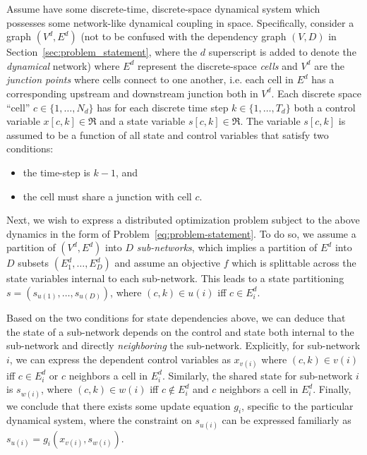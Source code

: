 Assume have some discrete-time, discrete-space dynamical system which possesses some network-like dynamical coupling in space. Specifically, consider a graph $\left(V^d, E^d\right)$ (not to be confused with the dependency graph $\left(V,D\right)$ in Section~\ref{sec:problem_statement}, where the $d$ superscript is added to denote the \emph{dynamical} network) where $E^d$ represent the discrete-space \emph{cells} and $V^d$ are the \emph{junction points} where cells connect to one another, i.e. each cell in $E^d$ has a corresponding upstream and downstream junction both in $V^d$.  Each discrete space ``cell'' $c \in \{1,\ldots,N_d\} $ has for each discrete time step $k \in \{1,\ldots,T_d\} $ both a control variable $x\left[c,k\right] \in \Re$ and a state variable $s\left[c,k\right] \in \Re$. The variable $s\left[c,k\right]$ is assumed to be a function of all state and control variables that satisfy two conditions:

\begin{itemize}
	\item the time-step is $k-1$, and
	\item the cell must share a junction with cell $c$.
\end{itemize}

Next, we wish to express a distributed optimization problem subject to the above dynamics in the form of Problem~\eqref{eq:problem-statement}. To do so, we assume a partition of $\left(V^d,E^d\right)$ into $D$ \emph{sub-networks}, which implies a partition of $E^d$ into $D$ subsets $\left(E^d_1,\ldots, E^d_D\right)$ and assume an objective $f$ which is splittable across the state variables internal to each sub-network. This leads to a state partitioning $s=\left(s_{u\left(1\right)}, \ldots, s_{u\left(D\right)}\right)$, where $ \left(c,k\right) \in u\left(i\right)$ iff $c \in E^d_i$.

Based on the two conditions for state dependencies above, we can deduce that the state of a sub-network depends on the control and state both internal to the sub-network and directly \emph{neighboring} the sub-network. Explicitly, for sub-network $i$, we can express the dependent control variables as $x_{v\left(i\right)}$ where $\left(c,k\right)\in v\left(i\right)$ iff $c \in E^d_i$ or $c$ neighbors a cell in $E^d_i$. Similarly, the shared state for sub-network $i$ is $s_{w\left(i\right)}$, where $\left(c,k\right)\in w\left(i\right)$ iff $c \notin E^d_i$ and $c$ neighbors a cell in $E^d_i$. Finally, we conclude that there exists some update equation $g_i$, specific to the particular dynamical system, where the constraint on $s_{u\left(i\right)}$ can be expressed familiarly as $s_{u\left(i\right)} = g_i\left(x_{v\left(i\right)}, s_{w\left(i\right)}\right)$.

